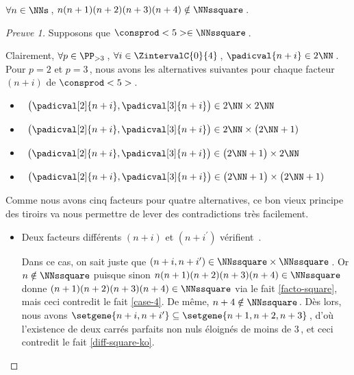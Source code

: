 \begin{fact} \label{case-5}
	 $\forall n \in \NNs$\,, $n(n+1)(n+2)(n+3)(n+4) \notin \NNssquare$\,.
\end{fact}




\begin{proof}[Preuve 1]%
    Supposons que $\consprod<5> \in \NNssquare$\,.
    
    \smallskip
    
    Clairement, 
    $\forall p \in \PP_{>3}$\,, 
    $\forall i \in \ZintervalC{0}{4}$\,, 
    $\padicval{n + i} \in 2 \NN$\,.
    Pour $p = 2$ et $p = 3$\,, nous avons les alternatives suivantes pour chaque facteur $(n+i)$ de $\consprod<5>$\,.
    \begin{itemize}
    	\smallskip
		\item {}\,
		$\big( \padicval[2]{n + i} , \padicval[3]{n + i} \big) \in 2 \NN \times 2 \NN$

    	\smallskip
		\item {}\,
		$\big( \padicval[2]{n + i} , \padicval[3]{n + i} \big) \in 2 \NN \times \big( 2 \NN + 1)$

    	\smallskip
		\item {}\,
		$\big( \padicval[2]{n + i} , \padicval[3]{n + i} \big) \in \big( 2 \NN + 1 \big) \times 2 \NN$

    	\smallskip
		\item {}\,
		$\big( \padicval[2]{n + i} , \padicval[3]{n + i} \big) \in \big( 2 \NN + 1 \big) \times \big( 2 \NN + 1)$
    \end{itemize}
    
    \medskip
    
    Comme nous avons cinq facteurs pour quatre alternatives, ce bon vieux principe des tiroirs va nous permettre de lever des contradictions très facilement.
    \begin{itemize}
    	\medskip
		\item Deux facteurs différents $(n+i)$ et $(n+i^\prime)$ vérifient \,.
		
		\smallskip
		\noindent
		Dans ce cas, on sait juste que $(n+i, n+i^\prime) \in \NNssquare \times \NNssquare$\,.
		Or $n \notin \NNssquare$ puisque sinon $n(n+1)(n+2)(n+3)(n+4) \in \NNssquare$ donne $(n+1)(n+2)(n+3)(n+4) \in \NNssquare$ via le fait \ref{facto-square}, mais ceci contredit le fait \ref{case-4}.
		De même, $n+4 \notin \NNssquare$\,.
		Dès lors, nous avons $\setgene{n+i, n+i^\prime} \subseteq \setgene{n+1, n+2, n+3}$\,, d'où l'existence de deux carrés parfaits non nuls éloignés de moins de $3$\,, et ceci contredit le fait \ref{diff-square-ko}.



\end{itemize}
\end{proof}
